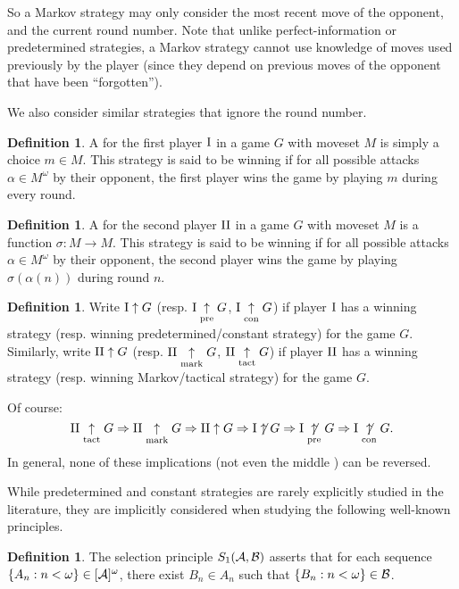 \documentclass{amsart}
\theoremstyle{plain}
\theoremstyle{definition}
\newtheorem{definition}[theorem]{Definition}
\theoremstyle{remark}
\theoremstyle{plain}
\theoremstyle{definition}
\theoremstyle{remark}
\begin{document}
So a Markov strategy may only consider the most recent move of the opponent,
and the current round number. Note that unlike perfect-information or
predetermined strategies, a Markov strategy cannot use knowledge of
moves used previously by the player (since they depend on previous moves of
the opponent that have been ``forgotten'').

We also consider similar strategies that ignore the round number.

\begin{definition}
  A  for the first player \(\mathrm{I}\)
  in a game \(G\) with moveset \(M\) is simply a choice \(m\in M\).
  This strategy is said to be winning if
  for all possible attacks \(\alpha\in M^\omega\) by their opponent,
  the first player wins the game by playing \(m\) during every round.
\end{definition}

\begin{definition}
  A  for the second player \(\mathrm{II}\)
  in a game \(G\) with moveset \(M\) is a function
  \(\sigma:M\to M\). This strategy is said to be winning if
  for all possible attacks \(\alpha\in M^\omega\) by their opponent,
  the second player wins the game by playing \(\sigma(\alpha(n))\)
  during round \(n\).
\end{definition}

\begin{definition}
  Write \(\mathrm{I}\uparrow G\) (resp. \(\mathrm{I}\underset{\text{pre}}{\uparrow} G\), \(\mathrm{I}\underset{\text{con}}{\uparrow} G\)) 
  if player \(\mathrm{I}\) has a winning
  strategy (resp. winning predetermined/constant strategy) for the game \(G\). Similarly,
  write \(\mathrm{II}\uparrow G\) (resp. \(\mathrm{II}\underset{\text{mark}}{\uparrow} G\), \(\mathrm{II}\underset{\text{tact}}{\uparrow} G\)) 
  if player \(\mathrm{II}\) has a winning
  strategy (resp. winning Markov/tactical strategy) for the game \(G\).
\end{definition}

Of course: 
\[
  \mathrm{II}\underset{\text{tact}}{\uparrow} G\Rightarrow 
  \mathrm{II}\underset{\text{mark}}{\uparrow} G\Rightarrow 
  \mathrm{II}\uparrow G\Rightarrow 
  \mathrm{I}\not\uparrow G\Rightarrow 
  \mathrm{I}\underset{\text{pre}}{\not\uparrow} G\Rightarrow 
  \mathrm{I}\underset{\text{con}}{\not\uparrow} G
.\]
In general, none of these implications (not even the middle \cite{MR0054922}) can be reversed.

While predetermined and constant strategies are rarely explicitly studied in the literature,
they are implicitly considered when studying the following well-known principles.

\begin{definition}
  The selection principle \(S_{1}(\mathcal{A},\mathcal{B})\) asserts
  that for each sequence \(\left\{A_n:n<\omega\right\}\in[\mathcal{A}]^\omega\),
  there exist \(B_n\in A_n\) such that \(\left\{B_n:n<\omega\right\}\in\mathcal{B}\).
\end{definition}
\end{document}
